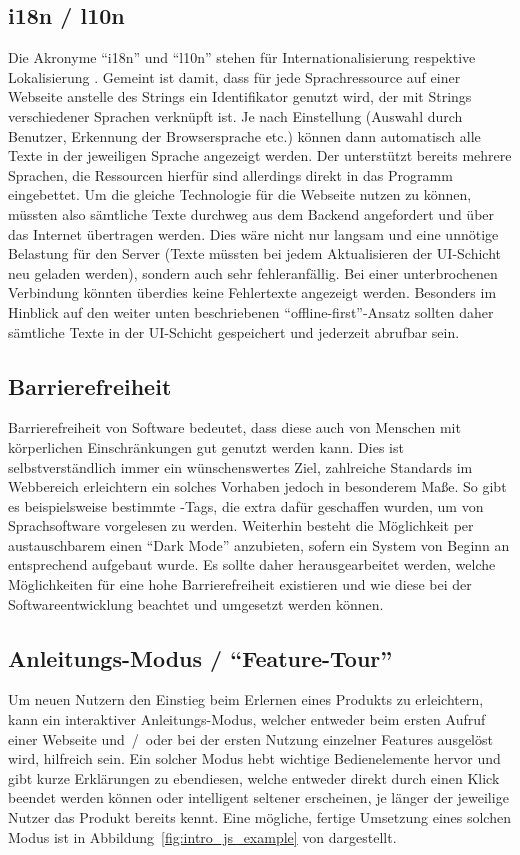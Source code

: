 \subsection{i18n / l10n}
Die Akronyme \enquote{i18n} und \enquote{l10n} stehen für Internationalisierung respektive Lokalisierung \parencite[vgl.][]{i18n_i10n_ishida_w3c_miller_boeing_2018}. Gemeint ist damit, dass für jede Sprachressource auf einer Webseite anstelle des Strings ein Identifikator genutzt wird, der mit Strings verschiedener Sprachen verknüpft ist. Je nach Einstellung (Auswahl durch Benutzer, Erkennung der Browsersprache etc.) können dann automatisch alle Texte in der jeweiligen Sprache angezeigt werden. Der  unterstützt bereits mehrere Sprachen, die Ressourcen hierfür sind allerdings direkt in das Programm eingebettet. Um die gleiche Technologie für die Webseite nutzen zu können, müssten also sämtliche Texte durchweg aus dem Backend angefordert und über das Internet übertragen werden. Dies wäre nicht nur langsam und eine unnötige Belastung für den Server (Texte müssten bei jedem Aktualisieren der UI-Schicht neu geladen werden), sondern auch sehr fehleranfällig. Bei einer unterbrochenen Verbindung könnten überdies keine Fehlertexte angezeigt werden. Besonders im Hinblick auf den weiter unten beschriebenen \enquote{offline-first}-Ansatz sollten daher sämtliche Texte in der UI-Schicht gespeichert und jederzeit abrufbar sein.

\subsection{Barrierefreiheit}
Barrierefreiheit von Software bedeutet, dass diese auch von Menschen mit körperlichen Einschränkungen gut genutzt werden kann. Dies ist selbstverständlich immer ein wünschenswertes Ziel, zahlreiche Standards im Webbereich erleichtern ein solches Vorhaben jedoch in besonderem Maße. So gibt es beispielsweise bestimmte -Tags, die extra dafür geschaffen wurden, um von Sprachsoftware vorgelesen zu werden. Weiterhin besteht die Möglichkeit per austauschbarem  einen \enquote{Dark Mode} anzubieten, sofern ein System von Beginn an entsprechend aufgebaut wurde.
Es sollte daher herausgearbeitet werden, welche Möglichkeiten für eine hohe Barrierefreiheit existieren und wie diese bei der Softwareentwicklung beachtet und umgesetzt werden können.

\subsection{Anleitungs-Modus / \enquote{Feature-Tour}}
 Um neuen Nutzern den Einstieg beim Erlernen eines Produkts zu erleichtern, kann ein interaktiver Anleitungs-Modus, welcher entweder beim ersten Aufruf einer Webseite und~/~oder bei der ersten Nutzung einzelner Features ausgelöst wird, hilfreich sein. Ein solcher Modus hebt wichtige Bedienelemente hervor und gibt kurze Erklärungen zu ebendiesen, welche entweder direkt durch einen Klick beendet werden können oder intelligent seltener erscheinen, je länger der jeweilige Nutzer das Produkt bereits kennt. Eine mögliche, fertige Umsetzung eines solchen Modus ist in Abbildung~\ref{fig:intro_js_example} von  dargestellt.

